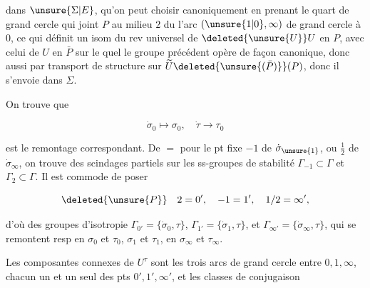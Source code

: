 
dans $\unsure{\Sigma|E}$, qu'on peut choisir canoniquement en prenant le quart de grand cercle qui joint $P$ au milieu $2$ du  l'arc $(\unsure{1|0},\infty)$ de grand cercle  à $0$, ce qui définit un isom du rev universel de $\deleted{\unsure{U}}U$ en $P$, avec celui de $U$ en $\bar P$ sur le quel le groupe précédent opère de façon canonique, donc aussi par transport de structure sur $\widetilde U\deleted{\unsure{(\bar P)}}(P)$, donc il s'envoie dans $\Sigma$.

On trouve que

\[
\dot\sigma_0\mapsto\sigma_0,\quad\dot\tau\longrightarrow\tau_0
\]

est le remontage correspondant. De $=$ pour le pt fixe $-1$ de $\dot\sigma_{\unsure{1}}$, ou $\frac12$ de $\dot\sigma_\infty$, on trouve des scindages partiels sur les ss-groupes de  stabilité $\Gamma_{-1}\subset\Gamma$ et $\Gamma_2\subset\Gamma$. Il est commode de poser

\[
\deleted{\unsure{P}}\quad 2=0',\quad-1=1',\quad1/2=\infty',
\]

d'où des groupes d'isotropie $\Gamma_{0'}=\{\dot\sigma_0,\tau\}$, $\Gamma_{1'}=\{\dot\sigma_1,\tau\}$, et $\Gamma_{\infty'}=\{\dot\sigma_\infty,\tau\}$, qui se remontent resp en $\sigma_0$ et $\tau_0$,  $\sigma_1$ et $\tau_1$, en $\sigma_\infty$ et $\tau_\infty$.

Les composantes connexes de $U^\tau$ sont les trois arcs de grand cercle entre $0,1,\infty$,   chacun un  et un seul des pts $0',1',\infty'$, et les classes de conjugaison

